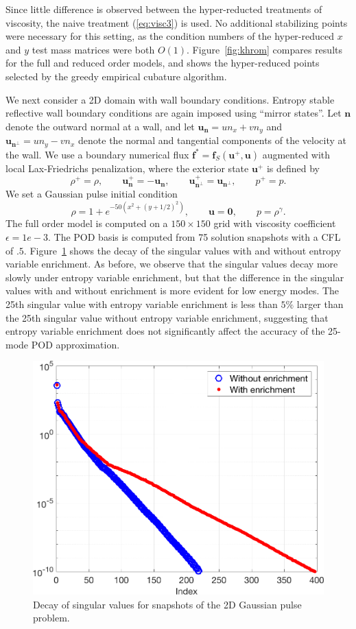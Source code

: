 \documentclass[preprint,10pt]{elsarticle}
\theoremstyle{definition}
\theoremstyle{lemma}
\theoremstyle{theorem}
\theoremstyle{assumption}
\newcommand{\LRp}[1]{\left( #1 \right)}
\begin{document}
Since little difference is observed between the hyper-reducted treatments of viscosity, the naive treatment (\ref{eq:visc3}) is used.  No additional stabilizing points were necessary for this setting, as the condition numbers of the hyper-reduced $x$ and $y$ test mass matrices were both $O(1)$.  Figure~\ref{fig:khrom} compares results for the full and reduced order models, and shows the hyper-reduced points selected by the greedy empirical cubature algorithm.  

We next consider a 2D domain with wall boundary conditions.  Entropy stable reflective wall boundary conditions are again imposed using ``mirror states''.   Let $\bm{n}$ denote the outward normal at a wall, and let $\bm{u}_{\bm{n}} = un_x + vn_y$ and $\bm{u}_{\bm{n}^\perp} = un_y - vn_x$ denote the normal and tangential components of the velocity at the wall.  We use a boundary numerical flux $\bm{f}^* = \bm{f}_S\LRp{\bm{u}^+,\bm{u}}$ augmented with local Lax-Friedrichs penalization, where the exterior state $\bm{u}^+$ is defined by
\[
\rho^+ = \rho, \qquad \bm{u}_{\bm{n}}^+ = -\bm{u}_{\bm{n}}, \qquad \bm{u}_{\bm{n}^\perp}^+ = \bm{u}_{\bm{n}^\perp}, \qquad p^+ = p.  
\]
We set a Gaussian pulse initial condition 
\[
\rho = 1 + e^{-50\LRp{x^2+(y+1/2)^2}}, \qquad \bm{u} = \bm{0}, \qquad p = \rho^{\gamma}.  
\]
The full order model is computed on a $150\times 150$ grid with viscosity coefficient $\epsilon = 1e-3$.  The POD basis is computed from 75 solution snapshots with a CFL of $.5$.  Figure~\ref{fig:pulse2dsvd} shows the decay of the singular values with and without entropy variable enrichment.  As before, we observe that the singular values decay more slowly under entropy variable enrichment, but that the difference in the singular values with and without enrichment is more evident for low energy modes.  The 25th singular value with entropy variable enrichment is less than $5\%$ larger than the 25th singular value without entropy variable enrichment, suggesting that entropy variable enrichment does not significantly affect the accuracy of the 25-mode POD approximation.  

\begin{figure}
\centering
\includegraphics[width=.4\textwidth]{pulse2dsvd.png}
\caption{Decay of singular values for snapshots of the 2D Gaussian pulse problem.}
\label{fig:pulse2dsvd}
\end{figure}
\end{document}
